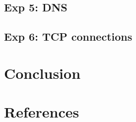 \documentclass[compilation.tex]{subfiles}
\begin{document}
\subsection{Exp 5: DNS}
\label{exp:5}


\subsection{Exp 6: TCP connections}
\label{exp:6}

%

\section{Conclusion}
\label{sec:conclusion}

\section{References}
\label{sec:references}
\end{document}
